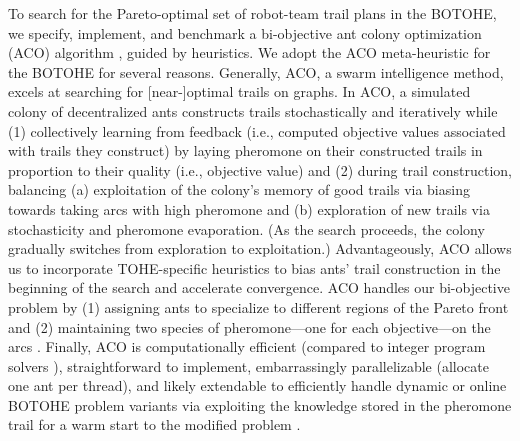 \documentclass[fleqn,10pt,lineno]{wlpeerj}
\begin{document}
To search for the Pareto-optimal set of robot-team trail plans in the BOTOHE, we specify, implement, and benchmark a bi-objective ant colony optimization (ACO) algorithm \cite{iredi2001bi}, guided by heuristics.
We adopt the ACO meta-heuristic \cite{dorigo2006ant,bonabeau1999swarm,blum2005ant} for the BOTOHE for several reasons.
Generally, ACO, a swarm intelligence method, excels at searching for [near-]optimal trails on graphs.
In ACO, a simulated colony of decentralized ants constructs trails stochastically and iteratively while 
(1) collectively learning from feedback (i.e., computed objective values associated with trails they construct) by laying pheromone on their constructed trails in proportion to their quality (i.e., objective value) and
(2) during trail construction, balancing 
(a) exploitation of the colony's memory of good trails via biasing towards taking arcs with high pheromone and 
(b) exploration of new trails via stochasticity and pheromone evaporation.
(As the search proceeds, the colony gradually switches from exploration to exploitation.)
Advantageously, ACO allows us to incorporate TOHE-specific heuristics to bias ants' trail construction in the beginning of the search and accelerate convergence.
ACO handles our bi-objective problem by (1) assigning ants to specialize to different regions of the Pareto front and (2) maintaining two species of pheromone---one for each objective---on the arcs \cite{iredi2001bi}.
Finally, ACO is computationally efficient (compared to integer program solvers \cite{pascariu2021train}), straightforward to implement, embarrassingly parallelizable (allocate one ant per thread), and likely extendable to efficiently handle dynamic or online BOTOHE problem variants via exploiting the knowledge stored in the pheromone trail for a warm start to the modified problem \cite{montemanni2005ant,angus2005dynamic,leguizamon2013ant,mavrovouniotis2020ant}.
\end{document}
